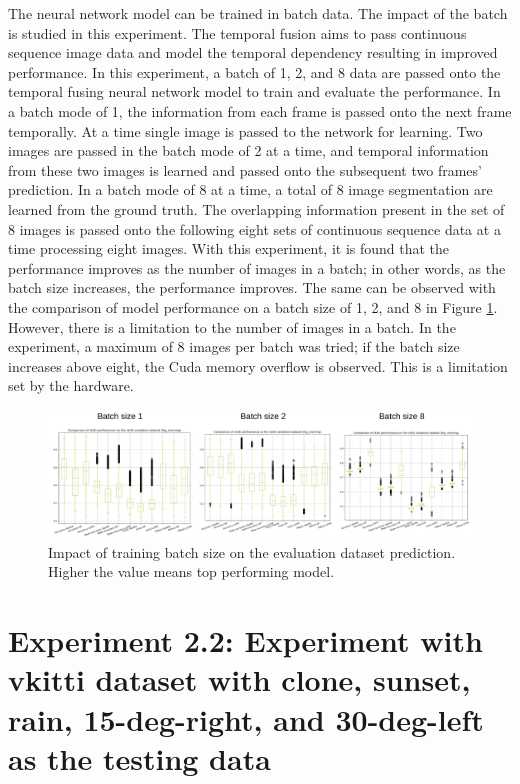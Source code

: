 	The neural network model can be trained in batch data. The impact of the batch is studied in this experiment. The temporal fusion aims to pass continuous sequence image data and model the temporal dependency resulting in improved performance. In this experiment, a batch of 1, 2, and 8 data are passed onto the temporal fusing neural network model to train and evaluate the performance. In a batch mode of 1, the information from each frame is passed onto the next frame temporally. At a time single image is passed to the network for learning. Two images are passed in the batch mode of 2 at a time, and temporal information from these two images is learned and passed onto the subsequent two frames' prediction. In a batch mode of 8 at a time, a total of 8 image segmentation are learned from the ground truth. The overlapping information present in the set of 8 images is passed onto the following eight sets of continuous sequence data at a time processing eight images. With this experiment, it is found that the performance improves as the number of images in a batch; in other words, as the batch size increases, the performance improves. The same can be observed with the comparison of model performance on a batch size of 1, 2, and 8 in Figure \ref{fig:batch_wise_performance}. However, there is a limitation to the number of images in a batch. In the experiment, a maximum of 8 images per batch was tried; if the batch size increases above eight, the Cuda memory overflow is observed. This is a limitation set by the hardware. 

	\begin{figure}
		\centering
		\includegraphics[width=16cm]{images/batch_wise_performance_comparison.png}
		\caption{Impact of training batch size on the evaluation dataset prediction. Higher the value means top performing model.}
		\label{fig:batch_wise_performance}
	\end{figure}		    
	
	\section{Experiment 2.2: Experiment with vkitti dataset with clone, sunset, rain, 15-deg-right, and 30-deg-left as the testing data}
		
